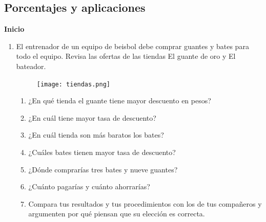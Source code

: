 \documentclass[11pt]{book}
\begin{document}
\subsection{Porcentajes y aplicaciones}
\begin{boxK}
  \begin{center}\textbf{Inicio}\end{center}

  \begin{enumerate}
    \item El entrenador de un equipo de beisbol debe comprar guantes y bates para todo el equipo.
          Revisa las ofertas de las tiendas El guante de oro y El bateador.
          \begin{figure}[H]
            \centering
            \texttt{[image: tiendas.png]}
            \label{fig:tiendas}
          \end{figure}
          \begin{enumerate}
            \item ¿En qué tienda el guante tiene mayor descuento en pesos?
            \item ¿En cuál tiene mayor tasa de descuento?
            \item ¿En cuál tienda son más baratos los bates?
            \item ¿Cuáles bates tienen mayor tasa de descuento?
            \item ¿Dónde comprarías tres bates y nueve guantes?
            \item ¿Cuánto pagarías y cuánto ahorrarías?
            \item Compara tus resultados y tus procedimientos con los de tus
                  compañeros y argumenten por qué piensan que su elección
                  es correcta.
          \end{enumerate}
  \end{enumerate}
\end{boxK}
\end{document}
